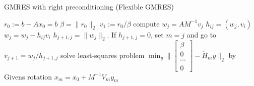 \documentclass[10pt]{article}
\begin{document}
\begin{algorithm}[H]
  \caption{GMRES with right preconditioning (Flexible GMRES)\citep[algorithm 9.5]{Saad_2003_IMS}}\label{alg:CG}
  \begin{algorithmic}[1]
    \State $r_0:=b-A x_0=b$
    \State $\beta=\|r_0\|_2$
    \State $v_1:=r_0/\beta$
    \State compute $w_j=AM^{-1}v_j$
        \State $h_{ij}=(w_j,v_i)$
        \State $w_j=w_j-h_{ij} v_i$
        \EndFor
    \State $h_{j+1,j}=\|w_j\|_2$. If $h_{j+1,j}=0$, set $m=j$ and go to
    \State $v_{j+1} = w_j/h_{j+1,j}$
    \State solve least-squares problem $\min_y\|\begin{bmatrix}
    \beta\\
    0\\
    \cdots\\
    0
    \end{bmatrix}- \tilde{H}_m y\|_2$ by Givens rotation
    \EndFor
    \State $x_m = x_0+M^{-1}V_m y_m$
  \end{algorithmic}
\end{algorithm}


%
\end{document}
